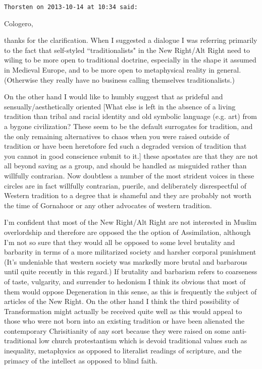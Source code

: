 \begin{footnotesize}\begin{sffamily}



\texttt{Thorsten on 2013-10-14 at 10:34 said: }

Cologero,

thanks for the clarification. When I suggested a dialogue I was referring primarily to the fact that self-styled ``traditionalists" in the New Right/Alt Right need to wiling to be more open to traditional doctrine, especially in the shape it assumed in Medieval Europe, and to be more open to metaphysical reality in general. (Otherwise they really have no business calling themselves traditionalists.)

On the other hand I would like to humbly suggest that as prideful and sensually/aesthetically oriented [What else is left in the absence of a living tradition than tribal and racial identity and old symbolic language (e.g. art) from a bygone civilization? These seem to be the default surrogates for tradition, and the only remaining alternatives to chaos when you were raised outside of tradition or have been heretofore fed such a degraded version of tradition that you cannot in good conscience submit to it.] these apostates are that they are not all beyond saving as a group, and should be handled as misguided rather than willfully contrarian. Now doubtless a number of the most strident voices in these circles are in fact willfully contrarian, puerile, and deliberately disrespectful of Western tradition to a degree that is shameful and they are probably not worth the time of Gornahoor or any other advocates of western tradition.

I'm confident that most of the New Right/Alt Right are not interested in Muslim overlordship and therefore are opposed the the option of Assimilation, although I'm not so sure that they would all be opposed to some level brutality and barbarity in terms of a more militarized society and harsher corporal punishment (It's undeniable that western society was markedly more brutal and barbarous until quite recently in this regard.) If brutality and barbarism refers to coarseness of taste, vulgarity, and surrender to hedonism I think its obvious that most of them would oppose Degeneration in this sense, as this is frequently the subject of articles of the New Right. On the other hand I think the third possibility of Transformation might actually be received quite well as this would appeal to those who were not born into an existing tradition or have been alienated the contemporary Chrisitianity of any sort because they were raised on some anti-traditional low church protestantism which is devoid traditional values such as inequality, metaphysics as opposed to literalist readings of scripture, and the primacy of the intellect as opposed to blind faith.


\end{sffamily}
\end{footnotesize}
